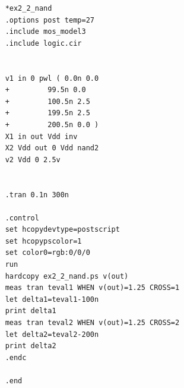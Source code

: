 \documentclass{jsarticle}
\begin{document}
\begin{lstlisting}
    *ex2_2_nand
    .options post temp=27
    .include mos_model3
    .include logic.cir
    
    
    v1 in 0 pwl ( 0.0n 0.0
    +	      99.5n 0.0
    +	      100.5n 2.5
    +	      199.5n 2.5
    +	      200.5n 0.0 )
    X1 in out Vdd inv
    X2 Vdd out 0 Vdd nand2
    v2 Vdd 0 2.5v
    
    
    .tran 0.1n 300n
    
    .control
    set hcopydevtype=postscript
    set hcopypscolor=1
    set color0=rgb:0/0/0
    run
    hardcopy ex2_2_nand.ps v(out)
    meas tran teval1 WHEN v(out)=1.25 CROSS=1
    let delta1=teval1-100n
    print delta1
    meas tran teval2 WHEN v(out)=1.25 CROSS=2
    let delta2=teval2-200n
    print delta2
    .endc
    
    .end
\end{lstlisting}

\begin{lstlisting}

\end{lstlisting}
\end{document}
